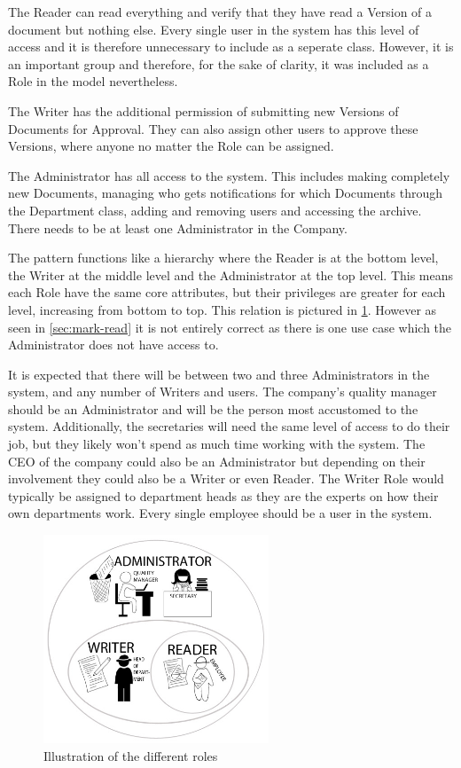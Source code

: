 \documentclass[../../master.tex]{subfiles}
\begin{document}
The Reader can read everything and verify that they have read a Version of a document but nothing else.
Every single user in the system has this level of access and it is therefore unnecessary to include as a seperate class.
However, it is an important group and therefore, for the sake of clarity, it was included as a Role in the model nevertheless.

The Writer has the additional permission of submitting new Versions of Documents for Approval. They can also assign other users to approve these Versions, where anyone no matter the Role can be assigned.

The Administrator has all access to the system.
This includes making completely new Documents, managing who gets notifications for which Documents through the Department class, adding and removing users and accessing the archive.
There needs to be at least one Administrator in the Company.

The pattern functions like a hierarchy where the Reader is at the bottom level, the Writer at the middle level and the Administrator at the top level. This means each Role have the same core attributes, but their privileges are greater for each level, increasing from bottom to top.
This relation is pictured in \cref{fig:RoleIllustration}.
However as seen in \cref{sec:mark-read} it is not entirely correct as there is one use case which the Administrator does not have access to.

It is expected that there will be between two and three Administrators in the system, and any number of Writers and users.
The company's quality manager should be an Administrator and will be the person most accustomed to the system.
Additionally, the secretaries will need the same level of access to do their job, but they likely won't spend as much time working with the system.
The CEO of the company could also be an Administrator but depending on their involvement they could also be a Writer or even Reader.
The Writer Role would typically be assigned to department heads as they are the experts on how their own departments work.
Every single employee should be a user in the system.

\begin{figure}[H]
	\centering
	\includegraphics[width=0.60\textwidth]{billeder/RP-Roller2.jpg}
	\caption{Illustration of the different roles\label{fig:RoleIllustration}}
\end{figure}
\end{document}
